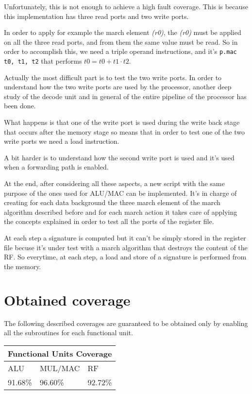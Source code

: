 \documentclass[paper=a4, fontsize=10pt]{scrartcl}	%
\begin{document}
	Unfortunately, this is not enough to achieve a high fault coverage. This is because this implementation has three read ports and two write ports. 
	
	In order to apply for example the march element \textit{(r0)}, the \textit{(r0)} must be applied on all the three read ports, and from them the same value must be read. So in order to accomplish this, we need a triple operand instructions, and it's \texttt{p.mac t0, t1, t2} that performs $t0 = t0 + t1 \cdot t2$.\newline

	Actually the most difficult part is to test the two write ports. In order to understand how the two write ports are used by the processor, another deep study of the decode unit and in general of the entire pipeline of the processor has been done. 
	
	What happens is that one of the write port is used during the write back stage that occurs after the memory stage so means that in order to test one of the two write ports we need a load instruction. 

	A bit harder is to understand how the second write port is used and it's used when a forwarding path is enabled. \newline

	At the end, after considering all these aspects, a new script with the same purpose of the ones used for ALU/MAC can be implemented. It's in charge of creating for each data background the three march element of the march algorithm described before and for each march action it takes care of applying the concepts explained in order to test all the ports of the register file. \newline

	At each step a signature is computed but it can't be simply stored in the register file becuse it's under test with a march algorithm that destroys the content of the RF. So everytime, at each step, a load and store of a signature is performed from the memory.
	\newpage
	\section{Obtained coverage}

	The following described coverages are guaranteed to be obtained only by enabling all the subroutines for each functional unit.

	\begin{center}
		\begin{tabular}{ |p{3cm}|p{3cm}|p{3cm}|  }
			\hline
			\multicolumn{3}{|c|}{Functional Units Coverage} \\
			\hline
			ALU&MUL/MAC&RF\\
			\hline
			91.68\%&96.60\%&92.72\%\\
			\hline
		\end{tabular}
	\end{center}
\end{document}

